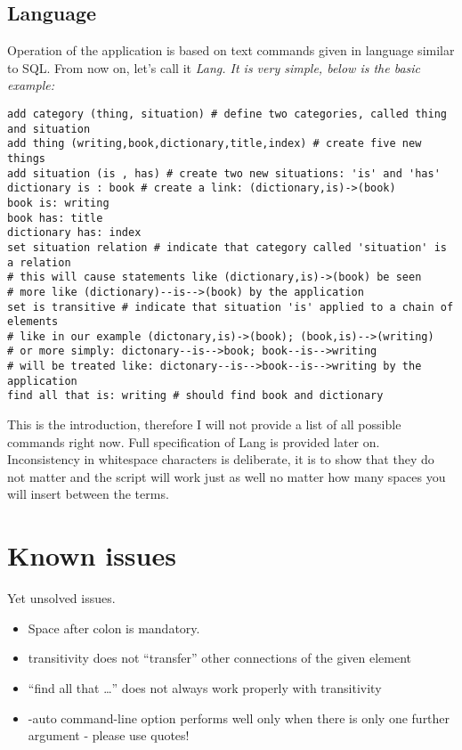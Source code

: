 \documentclass{article}
\begin{document}
\subsection{Language}
Operation of the application is based on text commands given in language similar to SQL. 
From now on, let's call it \em Lang\em . It is very simple, below is the basic example:
\begin{verbatim}
add category (thing, situation) # define two categories, called thing and situation
add thing (writing,book,dictionary,title,index) # create five new things 
add situation (is , has) # create two new situations: 'is' and 'has'
dictionary is : book # create a link: (dictionary,is)->(book)
book is: writing
book has: title
dictionary has: index
set situation relation # indicate that category called 'situation' is a relation
# this will cause statements like (dictionary,is)->(book) be seen 
# more like (dictionary)--is-->(book) by the application
set is transitive # indicate that situation 'is' applied to a chain of elements
# like in our example (dictonary,is)->(book); (book,is)-->(writing) 
# or more simply: dictonary--is-->book; book--is-->writing
# will be treated like: dictonary--is-->book--is-->writing by the application
find all that is: writing # should find book and dictionary
\end{verbatim}

This is the introduction, therefore I will not provide a list of all possible commands right now. 
Full specification of Lang is provided later on. Inconsistency in whitespace characters is deliberate,
it is to show that they do not matter and the script will work just as well no matter how many spaces
you will insert between the terms.


\section{Known issues}
Yet unsolved issues.

\begin{itemize}
  \item Space after colon is mandatory.
  \item transitivity does not ``transfer'' other connections of the given element
  \item ``find all that \ldots'' does not always work properly with transitivity
  \item -auto command-line option performs well only when there is only one further argument - please use quotes!
\end{itemize}
\end{document}
